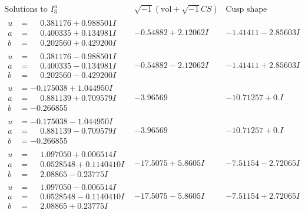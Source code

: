 \documentclass[1p]{elsarticle_modified}
\theoremstyle{definition}
\newcommand{\I}{\sqrt{-1}}
\begin{document}
$$\begin{array}{c|c|c}  
\text{Solutions to }I^u_{3}& \I (\text{vol} + \sqrt{-1}CS) & \text{Cusp shape}\\
 \hline 
\begin{aligned}
u &= \phantom{-}0.381176 + 0.988501 I \\
a &= \phantom{-}0.400335 + 0.134981 I \\
b &= \phantom{-}0.202560 + 0.429200 I\end{aligned}
 & -0.54882 + 2.12062 I & -1.41411 - 2.85603 I \\ \hline\begin{aligned}
u &= \phantom{-}0.381176 - 0.988501 I \\
a &= \phantom{-}0.400335 - 0.134981 I \\
b &= \phantom{-}0.202560 - 0.429200 I\end{aligned}
 & -0.54882 - 2.12062 I & -1.41411 + 2.85603 I \\ \hline\begin{aligned}
u &= -0.175038 + 1.044950 I \\
a &= \phantom{-}0.881139 + 0.709579 I \\
b &= -0.266855\phantom{ +0.000000I}\end{aligned}
 & -3.96569\phantom{ +0.000000I} & -10.71257 + 0. I\phantom{ +0.000000I} \\ \hline\begin{aligned}
u &= -0.175038 - 1.044950 I \\
a &= \phantom{-}0.881139 - 0.709579 I \\
b &= -0.266855\phantom{ +0.000000I}\end{aligned}
 & -3.96569\phantom{ +0.000000I} & -10.71257 + 0. I\phantom{ +0.000000I} \\ \hline\begin{aligned}
u &= \phantom{-}1.097050 + 0.006514 I \\
a &= \phantom{-}0.0528548 + 0.1140410 I \\
b &= \phantom{-}2.08865 - 0.23775 I\end{aligned}
 & -17.5075 + 5.8605 I & -7.51154 - 2.72065 I \\ \hline\begin{aligned}
u &= \phantom{-}1.097050 - 0.006514 I \\
a &= \phantom{-}0.0528548 - 0.1140410 I \\
b &= \phantom{-}2.08865 + 0.23775 I\end{aligned}
 & -17.5075 - 5.8605 I & -7.51154 + 2.72065 I \\ \hline\begin{aligned}

\end{aligned}
\end{array}$$
\end{document}
